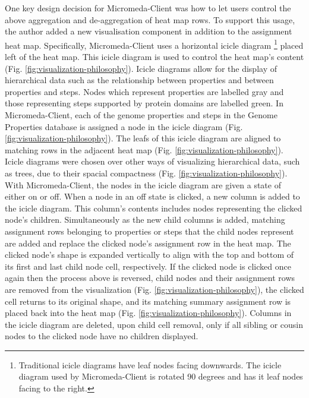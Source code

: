 One key design decision for Micromeda-Client was how to let users control the above aggregation and de-aggregation of heat map rows. To support this usage, the author added a new visualisation component in addition to the assignment heat map. Specifically, Micromeda-Client uses a horizontal icicle diagram \footnote{Traditional icicle diagrams have leaf nodes facing downwards. The icicle diagram used by Micromeda-Client is rotated 90 degrees and has it leaf nodes facing to the right.} placed left of the heat map. This icicle diagram is used to control the heat map's content (Fig. \ref{fig:visualization-philosophy}). Icicle diagrams allow for the display of hierarchical data such as the relationship between properties and between properties and steps. Nodes which represent properties are labelled gray and those representing steps supported by protein domains are labelled green. In Micromeda-Client, each of the genome properties and steps in the Genome Properties database is assigned a node in the icicle diagram (Fig. \ref{fig:visualization-philosophy}). The leafs of this icicle diagram are aligned to matching rows in the adjacent heat map (Fig. \ref{fig:visualization-philosophy}). Icicle diagrams were chosen over other ways of visualizing hierarchical data, such as trees, due to their spacial compactness (Fig. \ref{fig:visualization-philosophy}). With Micromeda-Client, the nodes in the icicle diagram are given a state of either on or off. When a node in an off state is clicked, a new column is added to the icicle diagram. This column's contents includes nodes representing the clicked node's children. Simultaneously as the new child columns is added, matching assignment rows belonging to properties or steps that the child nodes represent are added and replace the clicked node's assignment row in the heat map. The clicked node's shape is expanded vertically to align with the top and bottom of its first and last child node cell, respectively. If the clicked node is clicked once again then the process above is reversed, child nodes and their assignment rows are removed from the visualization (Fig. \ref{fig:visualization-philosophy}), the clicked cell returns to its original shape, and its matching summary assignment row is placed back into the heat map (Fig. \ref{fig:visualization-philosophy}). Columns in the icicle diagram are deleted, upon child cell removal, only if all sibling or cousin nodes to the clicked node have no children displayed.

